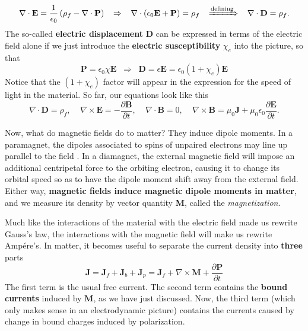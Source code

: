 \begin{equation}
    \nabla\cdot\textbf{E}=\frac{1}{\epsilon_0}\left(\rho_f-\nabla\cdot\textbf{P}\right)\;\;\;\Rightarrow\;\;\;\nabla\cdot\left(\epsilon_0\textbf{E}+\textbf{P}\right)=\rho_f\;\;\;\xRightarrow{\text{defining}}\;\;\; \nabla\cdot\textbf{D}=\rho_f.
\end{equation}
The so-called \textbf{electric displacement} $\textbf{D}$ can be expressed in terms of the electric field alone if we just introduce the \textbf{electric susceptibility} $\chi_e$ into the picture, so that
\begin{equation}
    \textbf{P}=\epsilon_0\chi\textbf{E}\;\;\Rightarrow\;\;\textbf{D}=\epsilon\textbf{E}=\epsilon_0(1+\chi_e)\textbf{E}
\end{equation}
Notice that the $(1+\chi_e)$ factor will appear in the expression for the speed of light in the material. So far, our equations look like this
\begin{equation}
    \nabla\cdot\textbf{D}=\rho_f,\;\;\;\;\nabla\times\textbf{E}=-\frac{\partial \textbf{B}}{\partial t},\;\;\;\;\nabla\cdot\textbf{B}=0,\;\;\;\;\nabla\times\textbf{B}=\mu_0\textbf{J}+\mu_0\epsilon_0\frac{\partial \textbf{E}}{\partial t}.
\end{equation}

Now, what do magnetic fields do to matter? They induce dipole moments. In a paramagnet, the dipoles associated to spins of unpaired electrons may line up parallel to the field . In a diamagnet, the external magnetic field will impose an additional centripetal force to the orbiting electron, causing it to change its orbital speed so as to have the dipole moment shift away from the external field. Either way, \textbf{magnetic fields induce magnetic dipole moments in matter}, and we measure its density by vector quantity \textbf{M}, called the \textit{magnetization}.

Much like the interactions of the material with the electric field made us rewrite Gauss's law, the interactions with the magnetic field will make us rewrite Ampére's. In matter, it becomes useful to separate the current density into \textbf{three} parts
\begin{equation}
    \textbf{J}=\textbf{J}_f+\textbf{J}_b+\textbf{J}_p=\textbf{J}_f+\nabla\times\textbf{M}+\frac{\partial\textbf{P}}{\partial t}
\end{equation}
The first term is the usual free current. The second term contains the \textbf{bound currents} induced by \textbf{M}, as we have just discussed. Now, the third term (which only makes sense in an electrodynamic picture) contains the currents caused by change in bound charges induced by polarization.

